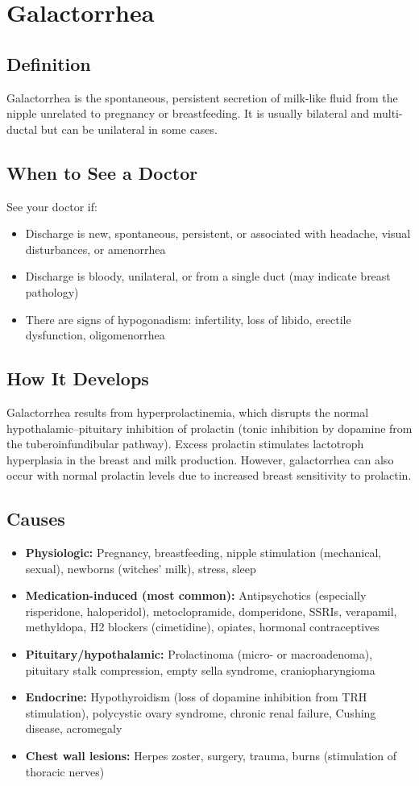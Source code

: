 \chapter{Galactorrhea}

\section*{Definition}
Galactorrhea is the spontaneous, persistent secretion of milk-like fluid from the nipple unrelated to pregnancy or breastfeeding. It is usually bilateral and multi-ductal but can be unilateral in some cases.

\section*{When to See a Doctor}
See your doctor if:
\begin{itemize}
  \item Discharge is new, spontaneous, persistent, or associated with headache, visual disturbances, or amenorrhea
  \item Discharge is bloody, unilateral, or from a single duct (may indicate breast pathology)
  \item There are signs of hypogonadism: infertility, loss of libido, erectile dysfunction, oligomenorrhea
\end{itemize}

\section*{How It Develops}
Galactorrhea results from hyperprolactinemia, which disrupts the normal hypothalamic--pituitary inhibition of prolactin (tonic inhibition by dopamine from the tuberoinfundibular pathway). Excess prolactin stimulates lactotroph hyperplasia in the breast and milk production. However, galactorrhea can also occur with normal prolactin levels due to increased breast sensitivity to prolactin.

\section*{Causes}
\begin{itemize}
  \item \textbf{Physiologic:} Pregnancy, breastfeeding, nipple stimulation (mechanical, sexual), newborns (witches' milk), stress, sleep
  \item \textbf{Medication-induced (most common):} Antipsychotics (especially risperidone, haloperidol), metoclopramide, domperidone, SSRIs, verapamil, methyldopa, H2 blockers (cimetidine), opiates, hormonal contraceptives
  \item \textbf{Pituitary/hypothalamic:} Prolactinoma (micro- or macroadenoma), pituitary stalk compression, empty sella syndrome, craniopharyngioma
  \item \textbf{Endocrine:} Hypothyroidism (loss of dopamine inhibition from TRH stimulation), polycystic ovary syndrome, chronic renal failure, Cushing disease, acromegaly
  \item \textbf{Chest wall lesions:} Herpes zoster, surgery, trauma, burns (stimulation of thoracic nerves)
\end{itemize}

